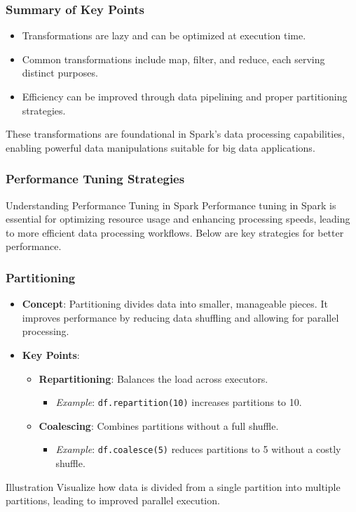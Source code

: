 \documentclass[aspectratio=169]{beamer}
\begin{document}
\begin{frame}
    \frametitle{Summary of Key Points}
    \begin{itemize}
        \item Transformations are lazy and can be optimized at execution time.
        \item Common transformations include map, filter, and reduce, each serving distinct purposes.
        \item Efficiency can be improved through data pipelining and proper partitioning strategies.
    \end{itemize}
    These transformations are foundational in Spark's data processing capabilities, enabling powerful data manipulations suitable for big data applications.
\end{frame}

\begin{frame}[fragile]
    \frametitle{Performance Tuning Strategies}
    \begin{block}{Understanding Performance Tuning in Spark}
        Performance tuning in Spark is essential for optimizing resource usage and enhancing processing speeds, leading to more efficient data processing workflows. Below are key strategies for better performance.
    \end{block}
\end{frame}

\begin{frame}[fragile]
    \frametitle{Partitioning}
    \begin{itemize}
        \item \textbf{Concept}: Partitioning divides data into smaller, manageable pieces. It improves performance by reducing data shuffling and allowing for parallel processing.
        \item \textbf{Key Points}:
        \begin{itemize}
            \item \textbf{Repartitioning}: Balances the load across executors.
            \begin{itemize}
                \item \textit{Example}: \texttt{df.repartition(10)} increases partitions to 10.
            \end{itemize}
            \item \textbf{Coalescing}: Combines partitions without a full shuffle.
            \begin{itemize}
                \item \textit{Example}: \texttt{df.coalesce(5)} reduces partitions to 5 without a costly shuffle.
            \end{itemize}
        \end{itemize}
    \end{itemize}
    \begin{block}{Illustration}
        Visualize how data is divided from a single partition into multiple partitions, leading to improved parallel execution.
    \end{block}
\end{frame}
\end{document}
